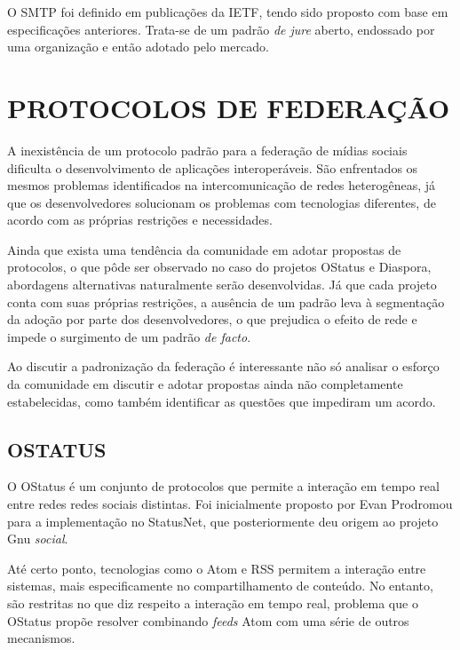 O SMTP foi definido em publicações da IETF, tendo sido proposto com base em
especificações anteriores. Trata-se de um padrão \textit{de jure} aberto, endossado
por uma organização e então adotado pelo mercado.



\section{PROTOCOLOS DE FEDERAÇÃO}


A inexistência de um protocolo padrão para a federação de mídias sociais dificulta
o desenvolvimento de aplicações interoperáveis. São enfrentados os mesmos problemas
identificados na intercomunicação de redes heterogêneas, já que os desenvolvedores
solucionam os problemas com tecnologias diferentes, de acordo com as próprias
restrições e necessidades.

Ainda que exista uma tendência da comunidade em adotar propostas de protocolos, o
que pôde ser observado no caso do projetos OStatus e Diaspora, abordagens
alternativas naturalmente serão desenvolvidas. Já que cada projeto conta com suas
próprias restrições, a ausência de um padrão leva à segmentação da adoção por parte
dos desenvolvedores, o que prejudica o efeito de rede e impede o surgimento de um
padrão \textit{de facto}.

Ao discutir a padronização da federação é interessante não só analisar o esforço da
comunidade em discutir e adotar propostas ainda não completamente estabelecidas,
como também identificar as questões que impediram um acordo.


\subsection{OSTATUS}

O OStatus é um conjunto de protocolos que permite a interação em tempo real entre
redes redes sociais distintas. Foi inicialmente proposto por Evan Prodromou para a
implementação no StatusNet, que posteriormente deu origem ao projeto Gnu
\textit{social}.

Até certo ponto, tecnologias como o Atom e RSS permitem a interação entre sistemas,
mais especificamente no compartilhamento de conteúdo. No entanto, são restritas no
que diz respeito a interação em tempo real, problema que o OStatus propõe resolver
combinando \textit{feeds} Atom com uma série de outros mecanismos.

